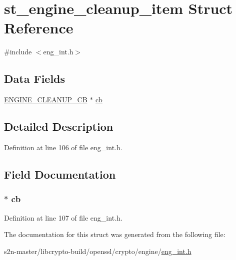 \hypertarget{structst__engine__cleanup__item}{}\section{st\+\_\+engine\+\_\+cleanup\+\_\+item Struct Reference}
\label{structst__engine__cleanup__item}


{\ttfamily \#include $<$eng\+\_\+int.\+h$>$}

\subsection*{Data Fields}
\begin{DoxyCompactItemize}
\item 
\hyperlink{eng__int_8h_a565d565f0036bf201ef06b6152e55d0d}{E\+N\+G\+I\+N\+E\+\_\+\+C\+L\+E\+A\+N\+U\+P\+\_\+\+CB} $\ast$ \hyperlink{structst__engine__cleanup__item_a620ab098438c3f2dfe10d229e5318104}{cb}
\end{DoxyCompactItemize}


\subsection{Detailed Description}


Definition at line 106 of file eng\+\_\+int.\+h.



\subsection{Field Documentation}
\subsubsection[{\texorpdfstring{cb}{cb}}]{$\ast$ cb}\hypertarget{structst__engine__cleanup__item_a620ab098438c3f2dfe10d229e5318104}{}\label{structst__engine__cleanup__item_a620ab098438c3f2dfe10d229e5318104}


Definition at line 107 of file eng\+\_\+int.\+h.



The documentation for this struct was generated from the following file\+:\begin{DoxyCompactItemize}
\item 
s2n-\/master/libcrypto-\/build/openssl/crypto/engine/\hyperlink{eng__int_8h}{eng\+\_\+int.\+h}\end{DoxyCompactItemize}
